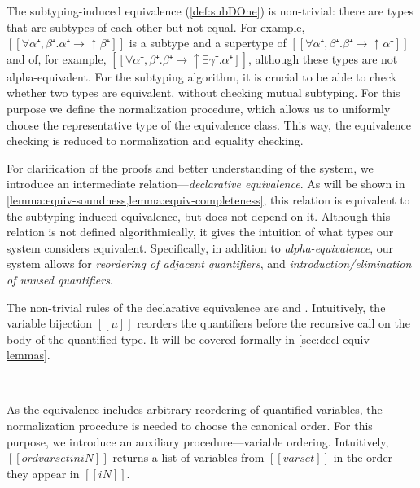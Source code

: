 \documentclass[acmsmall,natbib=false,review,anonymous]{acmart}
\begin{document}
The subtyping-induced equivalence (\cref{def:subDOne}) is non-trivial:
there are types that are subtypes of each other but not equal. 
For example, $[[∀α⁺,β⁺.α⁺ → ↑β⁺]]$ is a subtype and a supertype of $[[∀α⁺,β⁺.β⁺ → ↑α⁺]]$
and of, for example, $[[∀α⁺,β⁺.β⁺ → ↑∃γ⁻.α⁺]]$, 
although these types are not alpha-equivalent.
For the subtyping algorithm, it is crucial to be able to check whether
two types are equivalent, without checking mutual subtyping. 
For this purpose we define the normalization procedure, 
which allows us to uniformly choose the representative type of the equivalence class.
This way, the equivalence checking is reduced to normalization and equality checking. 

For clarification of the proofs and better understanding of the system, 
we introduce an intermediate relation---\emph{declarative equivalence}. 
As will be shown in \cref{lemma:equiv-soundness,lemma:equiv-completeness}, 
this relation is equivalent to the subtyping-induced equivalence, but does not 
depend on it. Although this relation is not defined algorithmically, 
it gives the intuition of what types our system considers equivalent.
Specifically, in addition to \emph{alpha-equivalence}, 
our system allows for \emph{reordering of adjacent quantifiers},
and \emph{introduction/elimination of unused quantifiers}.

The non-trivial rules of the declarative equivalence are
 and .
Intuitively, the variable bijection $[[μ]]$ reorders the quantifiers before
the recursive call on the body of the quantified type. 
It will be covered formally in \cref{sec:decl-equiv-lemmas}.

\begin{definition}
  \hfill
  
  \begin{multicols}{2}
  \ottdefnEOneNeqLabeled{}
  \columnbreak\\
  \ottdefnEOnePeqLabeled{}
  \end{multicols}

\end{definition}

As the equivalence includes arbitrary reordering of quantified variables,
the normalization procedure is needed to choose the canonical order.
For this purpose, we introduce an auxiliary procedure---variable ordering. 
Intuitively, $[[ord varset in iN]]$ returns a list of variables from $[[varset]]$
in the order they appear in $[[iN]]$.
\end{document}
